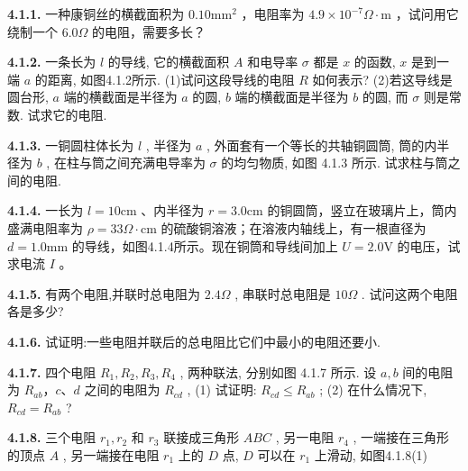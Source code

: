 \textbf{4.1.1.} 一种康铜丝的横截面积为 $0.10\mathrm{mm}^2$ ，电阻率为 $4.9 \times 10^{-7}\Omega \cdot \mathrm{m}$ ，试问用它绕制一个 $6.0\Omega$ 的电阻，需要多长？

\vfill
\newpage

\textbf{4.1.2.} 一条长为 $l$ 的导线, 它的横截面积 $A$ 和电导率 $\sigma$ 都是 $x$ 的函数, $x$ 是到一端 $a$ 的距离, 如图4.1.2所示. (1)试问这段导线的电阻 $R$ 如何表示? (2)若这导线是圆台形, $a$ 端的横截面是半径为 $a$ 的圆, $b$ 端的横截面是半径为 $b$ 的圆, 而 $\sigma$ 则是常数. 试求它的电阻.

\begin{center}
\end{center}

\vfill
\newpage

\textbf{4.1.3.} 一铜圆柱体长为 $l$ , 半径为 $a$ , 外面套有一个等长的共轴铜圆筒, 筒的内半径为 $b$ , 在柱与筒之间充满电导率为 $\sigma$ 的均匀物质, 如图 4.1.3 所示. 试求柱与筒之间的电阻.

\vfill
\newpage

\textbf{4.1.4.} 一长为 $l = 10\mathrm{cm}$ 、内半径为 $r = 3.0\mathrm{cm}$ 的铜圆筒，竖立在玻璃片上，筒内盛满电阻率为 $\rho = 33\Omega \cdot \mathrm{cm}$ 的硫酸铜溶液；在溶液内轴线上，有一根直径为 $d = 1.0\mathrm{mm}$ 的导线，如图4.1.4所示。现在铜筒和导线间加上 $U = 2.0\mathrm{V}$ 的电压，试求电流 $I$ 。

\vfill
\newpage

\textbf{4.1.5.} 有两个电阻,并联时总电阻为 $2.4\Omega$ , 串联时总电阻是 $10\Omega$ . 试问这两个电阻各是多少?

\vfill
\newpage

\textbf{4.1.6.} 试证明:一些电阻并联后的总电阻比它们中最小的电阻还要小.

\vfill
\newpage

\textbf{4.1.7.} 四个电阻 $R_{1}, R_{2}, R_{3}, R_{4}$ , 两种联法, 分别如图 4.1.7 所示. 设 $a, b$ 间的电阻为 $R_{ab}$，$c$、$d$ 之间的电阻为 $R_{cd}$ , (1) 试证明: $R_{cd} \leqslant R_{ab}$ ; (2) 在什么情况下, $R_{cd} = R_{ab}$ ?

\begin{center}
\end{center}

\vfill
\newpage

\textbf{4.1.8.} 三个电阻 $r_1, r_2$ 和 $r_3$ 联接成三角形 $ABC$ , 另一电阻 $r_4$ , 一端接在三角形的顶点 $A$ , 另一端接在电阻 $r_1$ 上的 $D$ 点, $D$ 可以在 $r_1$ 上滑动, 如图4.1.8(1)

